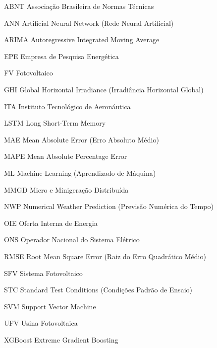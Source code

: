 \begin{listofabbreviations}
\item[ABNT]    Associação Brasileira de Normas Técnicas
\item[ANN]     Artificial Neural Network (Rede Neural Artificial)
\item[ARIMA]   Autoregressive Integrated Moving Average
\item[EPE]     Empresa de Pesquisa Energética
\item[FV]      Fotovoltaico
\item[GHI]     Global Horizontal Irradiance (Irradiância Horizontal Global)
\item[ITA]     Instituto Tecnológico de Aeronáutica
\item[LSTM]    Long Short-Term Memory
\item[MAE]     Mean Absolute Error (Erro Absoluto Médio)
\item[MAPE]    Mean Absolute Percentage Error
\item[ML]      Machine Learning (Aprendizado de Máquina)
\item[MMGD]    Micro e Minigeração Distribuída
\item[NWP]     Numerical Weather Prediction (Previsão Numérica do Tempo)
\item[OIE]     Oferta Interna de Energia
\item[ONS]     Operador Nacional do Sistema Elétrico
\item[RMSE]    Root Mean Square Error (Raiz do Erro Quadrático Médio)
\item[SFV]     Sistema Fotovoltaico
\item[STC]     Standard Test Conditions (Condições Padrão de Ensaio)
\item[SVM]     Support Vector Machine
\item[UFV]     Usina Fotovoltaica
\item[XGBoost] Extreme Gradient Boosting
\end{listofabbreviations}
